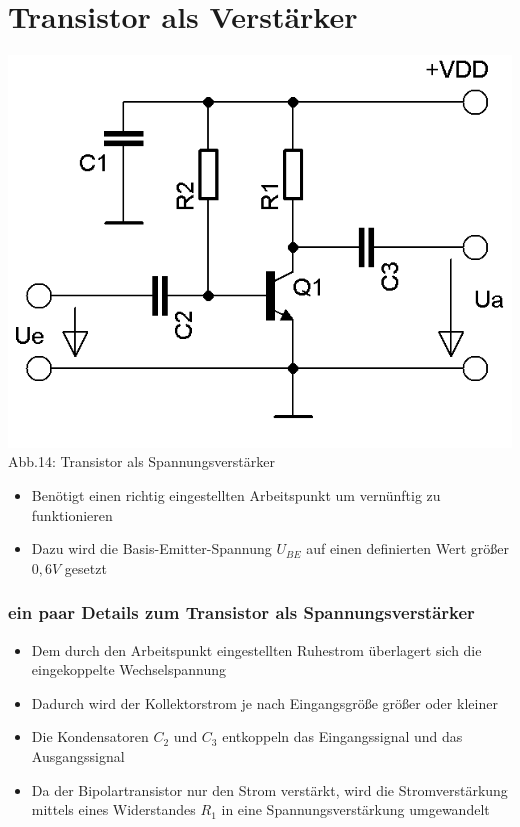 \section*{Transistor als Verstärker}
\begin{frame}
	\begin{center}
		\includegraphics[scale=1.2]{a06/Transistor-Verstaerker.png}\\
		Abb.14: Transistor als Spannungsverstärker \cite{bnetza}
	\end{center}
	\begin{itemize}
		\item	Benötigt einen richtig eingestellten Arbeitspunkt um vernünftig zu funktionieren
		\item	Dazu wird die Basis-Emitter-Spannung $U_{BE}$ auf einen definierten Wert größer $0,6 V$ gesetzt
	\end{itemize}
\end{frame}

\begin{frame}
	\frametitle{ein paar Details zum Transistor als Spannungsverstärker}
	\begin{itemize}
		\item	Dem durch den Arbeitspunkt eingestellten Ruhestrom überlagert sich die eingekoppelte Wechselspannung
		\item	Dadurch wird der Kollektorstrom je nach Eingangsgröße größer oder kleiner
		\item	Die Kondensatoren $C_2$ und $C_3$ entkoppeln das Eingangssignal und das Ausgangssignal
		\item	Da der Bipolartransistor nur den Strom verstärkt, wird die Stromverstärkung mittels eines Widerstandes $R_1$ in eine Spannungsverstärkung umgewandelt
	\end{itemize}
\end{frame}

